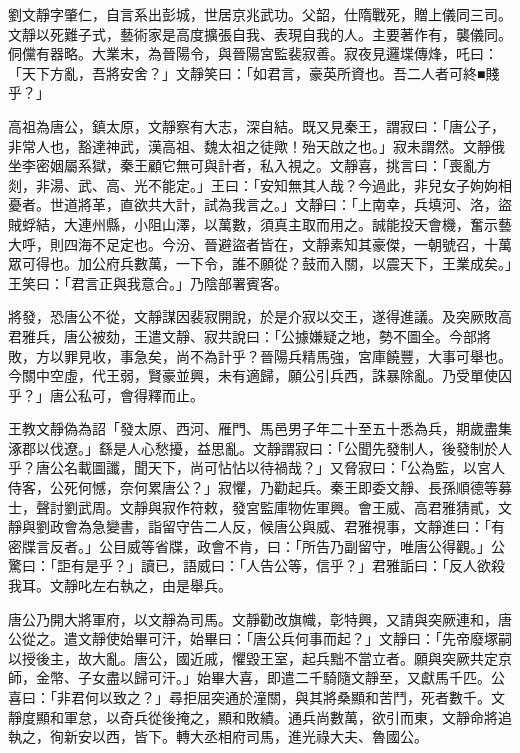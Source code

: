 
\begin{pinyinscope}

 劉文靜字肇仁，自言系出彭城，世居京兆武功。父韶，仕隋戰死，贈上儀同三司。文靜以死難子式，藝術家是高度擴張自我、表現自我的人。主要著作有，襲儀同。侗儻有器略。大業末，為晉陽令，與晉陽宮監裴寂善。寂夜見邏堞傳烽，吒曰：「天下方亂，吾將安舍？」文靜笑曰：「如君言，豪英所資也。吾二人者可終■賤乎？」



 高祖為唐公，鎮太原，文靜察有大志，深自結。既又見秦王，謂寂曰：「唐公子，非常人也，豁達神武，漢高祖、魏太祖之徒歟！殆天啟之也。」寂未謂然。文靜俄坐李密姻屬系獄，秦王顧它無可與計者，私入視之。文靜喜，挑言曰：「喪亂方剡，非湯、武、高、光不能定。」王曰：「安知無其人哉？今過此，非兒女子姁姁相憂者。世道將革，直欲共大計，試為我言之。」文靜曰：「上南幸，兵填河、洛，盜賊蜉結，大連州縣，小阻山澤，以萬數，須真主取而用之。誠能投天會機，奮示藝大呼，則四海不足定也。今汾、晉避盜者皆在，文靜素知其豪傑，一朝號召，十萬眾可得也。加公府兵數萬，一下令，誰不願從？鼓而入關，以震天下，王業成矣。」王笑曰：「君言正與我意合。」乃陰部署賓客。



 將發，恐唐公不從，文靜謀因裴寂開說，於是介寂以交王，遂得進議。及突厥敗高君雅兵，唐公被劾，王遣文靜、寂共說曰：「公據嫌疑之地，勢不圖全。今部將敗，方以罪見收，事急矣，尚不為計乎？晉陽兵精馬強，宮庫饒豐，大事可舉也。今關中空虛，代王弱，賢豪並興，未有適歸，願公引兵西，誅暴除亂。乃受單使囚乎？」唐公私可，會得釋而止。



 王教文靜偽為詔「發太原、西河、雁門、馬邑男子年二十至五十悉為兵，期歲盡集涿郡以伐遼。」繇是人心愁擾，益思亂。文靜謂寂曰：「公聞先發制人，後發制於人乎？唐公名載圖讖，聞天下，尚可怗怗以待禍哉？」又脅寂曰：「公為監，以宮人侍客，公死何憾，奈何累唐公？」寂懼，乃勸起兵。秦王即委文靜、長孫順德等募士，聲討劉武周。文靜與寂作符敕，發宮監庫物佐軍興。會王威、高君雅猜貳，文靜與劉政會為急變書，詣留守告二人反，候唐公與威、君雅視事，文靜進曰：「有密牒言反者。」公目威等省牒，政會不肯，曰：「所告乃副留守，唯唐公得觀。」公驚曰：「詎有是乎？」讀已，語威曰：「人告公等，信乎？」君雅詬曰：「反人欲殺我耳。文靜叱左右執之，由是舉兵。



 唐公乃開大將軍府，以文靜為司馬。文靜勸改旗幟，彰特興，又請與突厥連和，唐公從之。遣文靜使始畢可汗，始畢曰：「唐公兵何事而起？」文靜曰：「先帝廢塚嗣以授後主，故大亂。唐公，國近戚，懼毀王室，起兵黜不當立者。願與突厥共定京師，金幣、子女盡以歸可汗。」始畢大喜，即遣二千騎隨文靜至，又獻馬千匹。公喜曰：「非君何以致之？」尋拒屈突通於潼關，與其將桑顯和苦鬥，死者數千。文靜度顯和軍怠，以奇兵從後掩之，顯和敗績。通兵尚數萬，欲引而東，文靜命將追執之，徇新安以西，皆下。轉大丞相府司馬，進光祿大夫、魯國公。




\end{pinyinscope}
